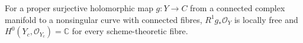 
\begin{proposition}\label{cdp:st:E4}
For a proper surjective holomorphic map $g:Y\to C$ from a connected complex
manifold to a nonsingular curve with connected fibres,
$R^1g_*\mathcal O_Y$ is locally free and
$H^0(Y_c,\mathcal O_{Y_c})=\mathbb C$ for every scheme-theoretic fibre.
\end{proposition}

